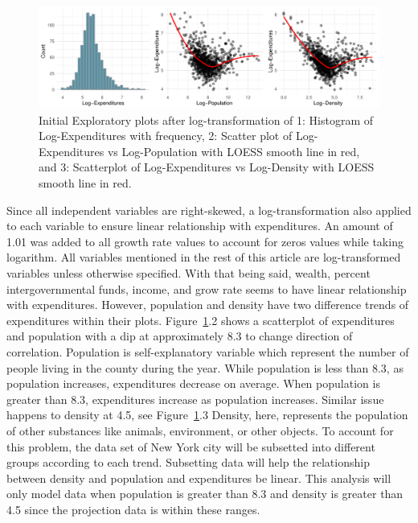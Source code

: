 \documentclass[11pt]{article}\usepackage[]{graphicx}\usepackage[]{color}
\makeatletter
\def\maxwidth{ %
  \ifdim\Gin@nat@width>\linewidth
    \linewidth
  \else
    \Gin@nat@width
  \fi
}
\makeatother
\begin{document}
\begin{figure}[h!] 
\begin{center}

\includegraphics[width=\maxwidth]{figure/unnamed-chunk-1-1} 

\caption{Initial Exploratory plots after log-transformation of 1: Histogram of Log-Expenditures with frequency, 2: Scatter plot of Log-Expenditures vs Log-Population with LOESS smooth line in red, and 3: Scatterplot of Log-Expenditures vs Log-Density with LOESS smooth line in red.}
\label{inital-explore}
\end{center} 
\end{figure}

\noindent Since all independent variables are right-skewed, a log-transformation also applied to each variable to ensure linear relationship with expenditures. An amount of 1.01 was added to all growth rate values to account for zeros values while taking logarithm. All variables mentioned in the rest of this article are log-transformed variables unless otherwise specified. With that being said, wealth, percent intergovernmental funds, income, and grow rate seems to have linear relationship with expenditures. However, population and density have two difference trends of expenditures within their plots. Figure~\ref{inital-explore}.2 shows a scatterplot of expenditures and population with a dip at approximately 8.3 to change direction of correlation. Population is self-explanatory variable which represent the number of people living in the county during the year. While population is less than 8.3, as population increases, expenditures decrease on average. When population is greater than 8.3, expenditures increase as population increases. Similar issue happens to density at 4.5, see Figure~\ref{inital-explore}.3 Density, here, represents the population of other substances like animals, environment, or other objects. To account for this problem, the data set of New York city will be subsetted into different groups according to each trend. Subsetting data will help the relationship between density and population and expenditures be linear. This analysis will only model data when population is greater than 8.3 and density is greater than 4.5 since the projection data is within these ranges.    
\hfill \break
\end{document}

